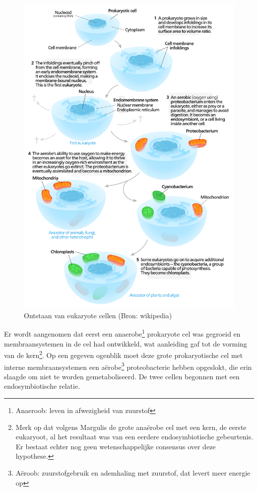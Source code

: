 \documentclass[
  11pt,
]{book}
\begin{document}
\begin{figure}

{\centering \includegraphics[width=0.8\linewidth]{./figs/endosymbiosis} 

}

\caption{Ontstaan van eukaryote cellen (Bron: wikipedia)}\label{fig:endosymbiosis}
\end{figure}

Er wordt aangenomen dat eerst een anaerobe\footnote{Anaeroob: leven in afwezigheid van zuurstof} prokaryote cel was gegroeid en membraansystemen in de cel had ontwikkeld, wat aanleiding gaf tot de vorming van de kern\footnote{Merk op dat volgens Margulis de grote anaërobe cel met een kern, de eerste eukaryoot, al het resultaat was van een eerdere endosymbiotische gebeurtenis. Er bestaat echter nog geen wetenschappelijke consensus over deze hypothese.}.
Op een gegeven ogenblik moet deze grote prokaryotische cel met interne membraansystemen een aërobe\footnote{Aëroob: zuurstofgebruik en ademhaling met zuurstof, dat levert meer energie op} proteobacterie hebben opgeslokt, die erin slaagde om niet te worden gemetaboliseerd. De twee cellen begonnen met een endosymbiotische relatie.
\end{document}
